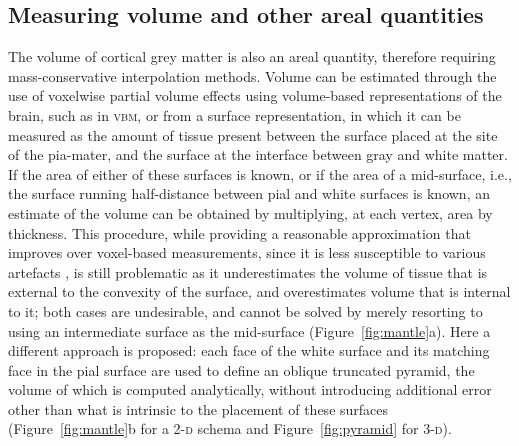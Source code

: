 \subsection{Measuring volume and other areal quantities}

The volume of cortical grey matter is also an areal quantity, therefore requiring mass-conservative interpolation methods. Volume can be estimated through the use of voxelwise partial volume effects using volume-based representations of the brain, such as in \textsc{vbm}, or from a surface representation, in which it can be measured as the amount of tissue present between the surface placed at the site of the pia-mater, and the surface at the interface between gray and white matter. If the area of either of these surfaces is known, or if the area of a mid-surface, i.e., the surface running half-distance between pial and white surfaces \citep{vanEssen2005} is known, an estimate of the volume can be obtained by multiplying, at each vertex, area by thickness. This procedure, while providing a reasonable approximation that improves over voxel-based measurements, since it is less susceptible to various artefacts \cite[for a discussion of artefacts in \textsc{vbm}, see][]{Ashburner2009}, is still problematic as it underestimates the volume of tissue that is external to the convexity of the surface, and overestimates volume that is internal to it; both cases are undesirable, and cannot be solved by merely resorting to using an intermediate surface as the mid-surface (Figure~\ref{fig:mantle}a). Here a different approach is proposed: each face of the white surface and its matching face in the pial surface are used to define an oblique truncated pyramid, the volume of which is computed analytically, without introducing additional error other than what is intrinsic to the placement of these surfaces (Figure~\ref{fig:mantle}b for a 2-\textsc{d} schema and Figure~\ref{fig:pyramid} for 3-\textsc{d}).

